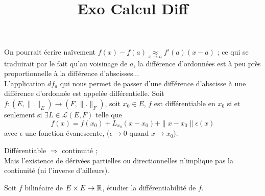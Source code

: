 

\title{Exo Calcul Diff}

\maketitle
On pourrait écrire naïvement $\displaystyle f(x) - f(a) \underset{x \to a}{\approx} f'(a)(x-a)$ ; ce qui se traduirait par le fait qu'au voisinage de $a$, la différence d'ordonnées est à peu près proportionnelle à la différence d'abscisses...\\
L'application $df_a$ qui nous permet de passer d'une différence d'abscisse à une différence d'ordonnée est appelée différentielle.
\bd
Soit $f : (E, \|.\|_E) \to (F, \|.\|_F)$, soit $x_0 \in E$, $f$ est différentiable en $x_0$ si et seulement si $\exists L \in \mathcal L(E,F)$ telle que $$f(x) = f(x_0) + L_{x_0}(x-x_0) + \|x - x_0\| \epsilon (x)$$ avec $\epsilon$ une fonction évanescente, (\ie $\epsilon \to 0$ quand $x \to x_0$).
\ed

\bw
\doigt Différentiable $\Rightarrow$ continuité ;\\
\doigt Mais l'existence de dérivées partielles ou directionnelles n'implique pas la continuité (ni l'inverse d'ailleurs).
\ew

\be
Soit $f$ bilinéaire de $E\times E \to \mathbb{R}$, étudier la différentiabilité de $f$.
\ee

